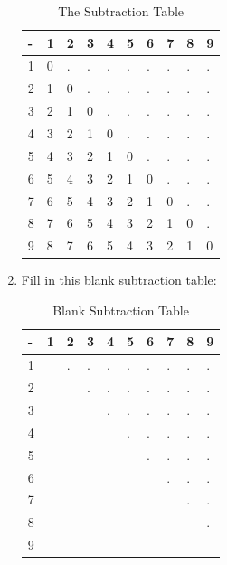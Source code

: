 \documentclass[12pt]{article}
\begin{document}
\begin{enumerate}
\begin{table}[h]
\centering
\begin{tabular}{|l|l|l|l|l|l|l|l|l|l|}
\hline
- & 1 & 2 & 3 & 4 & 5 & 6 & 7 & 8 & 9 \\ \hline
1 & 0 & . & . & . & . & . & . & . & . \\ \hline
2 & 1 & 0 & . & . & . & . & . & . & . \\ \hline
3 & 2 & 1 & 0 & . & . & . & . & . & . \\ \hline
4 & 3 & 2 & 1 & 0 & . & . & . & . & . \\ \hline
5 & 4 & 3 & 2 & 1 & 0 & . & . & . & . \\ \hline
6 & 5 & 4 & 3 & 2 & 1 & 0 & . & . & . \\ \hline
7 & 6 & 5 & 4 & 3 & 2 & 1 & 0 & . & . \\ \hline
8 & 7 & 6 & 5 & 4 & 3 & 2 & 1 & 0 & . \\ \hline
9 & 8 & 7 & 6 & 5 & 4 & 3 & 2 & 1 & 0 \\ \hline
\end{tabular}
\caption*{The Subtraction Table}
\end{table}

\item Fill in this blank subtraction table:\\

\begin{table}[ht]
\centering
\begin{tabular}{|l|l|l|l|l|l|l|l|l|l|}
\hline
- & 1 & 2 & 3 & 4 & 5 & 6 & 7 & 8 & 9 \\ \hline
1 &  & . & . & . & . & . & . & . & . \\ \hline
2 &  &  & . & . & . & . & . & . & . \\ \hline
3 &  &  &  & . & . & . & . & . & . \\ \hline
4 &  &  &  &  & . & . & . & . & . \\ \hline
5 &  &  &  &  &  & . & . & . & . \\ \hline
6 &  &  &  &  &  &  & . & . & . \\ \hline
7 &  &  &  &  &  &  &  & . & . \\ \hline
8 &  &  &  &  &  &  &  &  & . \\ \hline
9 &  &  &  &  &  &  &  &  &  \\ \hline
\end{tabular}
\caption*{Blank Subtraction Table}
\end{table}

\newpage


\end{enumerate}
\end{document}
